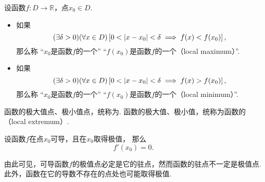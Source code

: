 \begin{definition}\label{definition:函数的极值与最值.极值点}
设函数\(f\colon D\to\mathbb{R}\)，点\(x_0 \in D\).
\begin{itemize}
	\item 如果\begin{equation*}
		(\exists\delta>0)
		(\forall x \in D)
		\left[
			0<\abs{x-x_0}<\delta
			\implies
			f(x)<f(x_0)
		\right],
	\end{equation*}
	那么称
	“\(x_0\)是函数\(f\)的一个”
	“\(f(x_0)\)是函数\(f\)的一个（local maximum）”.

	\item 如果\begin{equation*}
		(\exists\delta>0)
		(\forall x \in D)
		\left[
			0<\abs{x-x_0}<\delta
			\implies
			f(x)>f(x_0)
		\right],
	\end{equation*}
	那么称
	“\(x_0\)是函数\(f\)的一个”
	“\(f(x_0)\)是函数\(f\)的一个（local minimum）”.
\end{itemize}

函数的极大值点、极小值点，统称为.
函数的极大值、极小值，统称为函数的（local extremum）.
\end{definition}

\begin{theorem}[函数存在极值的必要条件]\label{theorem:微分中值定理.函数存在极值的必要条件}
设函数\(f\)在点\(x_0\)可导，且在\(x_0\)取得极值，
那么\begin{equation*}
	f'(x_0) = 0.
\end{equation*}
\end{theorem}
由此可见，可导函数\(f\)的极值点必定是它的驻点，然而函数的驻点不一定是极值点.
此外，函数在它的导数不存在的点处也可能取得极值.

